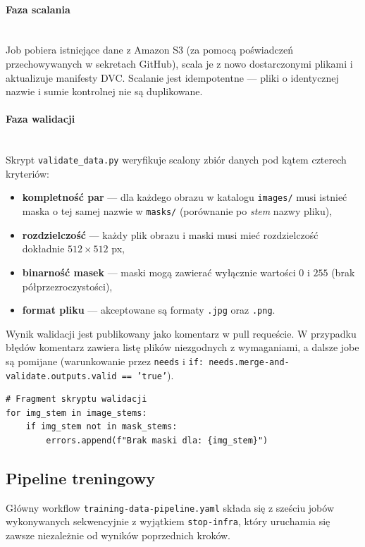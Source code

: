 \paragraph{Faza scalania}\mbox{}\\
Job pobiera istniejące dane z Amazon S3 (za pomocą poświadczeń przechowywanych w sekretach GitHub), scala je z nowo dostarczonymi plikami i aktualizuje manifesty DVC. Scalanie jest idempotentne --- pliki o identycznej nazwie i sumie kontrolnej nie są duplikowane.

\paragraph{Faza walidacji}\mbox{}\\
Skrypt \texttt{validate\_data.py} weryfikuje scalony zbiór danych pod kątem czterech kryteriów:
\begin{itemize}
  \item \textbf{kompletność par} --- dla każdego obrazu w katalogu \texttt{images/} musi istnieć maska o tej samej nazwie w \texttt{masks/} (porównanie po \textit{stem} nazwy pliku),
  \item \textbf{rozdzielczość} --- każdy plik obrazu i maski musi mieć rozdzielczość dokładnie $512 \times 512$ px,
  \item \textbf{binarność masek} --- maski mogą zawierać wyłącznie wartości $0$ i $255$ (brak półprzezroczystości),
  \item \textbf{format pliku} --- akceptowane są formaty \texttt{.jpg} oraz \texttt{.png}.
\end{itemize}

Wynik walidacji jest publikowany jako komentarz w pull requeście. W przypadku błędów komentarz zawiera listę plików niezgodnych z wymaganiami, a dalsze jobe są pomijane (warunkowanie przez \texttt{needs} i \texttt{if: needs.merge-and-validate.outputs.valid == 'true'}).

\begin{verbatim}
# Fragment skryptu walidacji
for img_stem in image_stems:
    if img_stem not in mask_stems:
        errors.append(f"Brak maski dla: {img_stem}")
\end{verbatim}

\subsection{Pipeline treningowy}

Główny workflow \texttt{training-data-pipeline.yaml} składa się z sześciu jobów wykonywanych sekwencyjnie z wyjątkiem \texttt{stop-infra}, który uruchamia się zawsze niezależnie od wyników poprzednich kroków.

